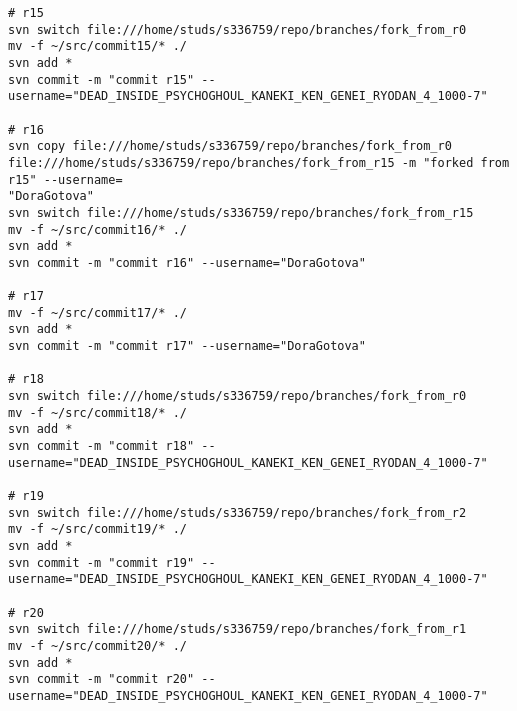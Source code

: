 \begin{verbatim}
# r15
svn switch file:///home/studs/s336759/repo/branches/fork_from_r0
mv -f ~/src/commit15/* ./
svn add *
svn commit -m "commit r15" --username="DEAD_INSIDE_PSYCHOGHOUL_KANEKI_KEN_GENEI_RYODAN_4_1000-7"

# r16
svn copy file:///home/studs/s336759/repo/branches/fork_from_r0 file:///home/studs/s336759/repo/branches/fork_from_r15 -m "forked from r15" --username=
"DoraGotova"
svn switch file:///home/studs/s336759/repo/branches/fork_from_r15
mv -f ~/src/commit16/* ./
svn add *
svn commit -m "commit r16" --username="DoraGotova"

# r17
mv -f ~/src/commit17/* ./
svn add *
svn commit -m "commit r17" --username="DoraGotova"

# r18
svn switch file:///home/studs/s336759/repo/branches/fork_from_r0
mv -f ~/src/commit18/* ./
svn add *
svn commit -m "commit r18" --username="DEAD_INSIDE_PSYCHOGHOUL_KANEKI_KEN_GENEI_RYODAN_4_1000-7"

# r19
svn switch file:///home/studs/s336759/repo/branches/fork_from_r2
mv -f ~/src/commit19/* ./
svn add *
svn commit -m "commit r19" --username="DEAD_INSIDE_PSYCHOGHOUL_KANEKI_KEN_GENEI_RYODAN_4_1000-7"

# r20
svn switch file:///home/studs/s336759/repo/branches/fork_from_r1
mv -f ~/src/commit20/* ./
svn add *
svn commit -m "commit r20" --username="DEAD_INSIDE_PSYCHOGHOUL_KANEKI_KEN_GENEI_RYODAN_4_1000-7"
\end{verbatim}
\normalsize
\newpage

